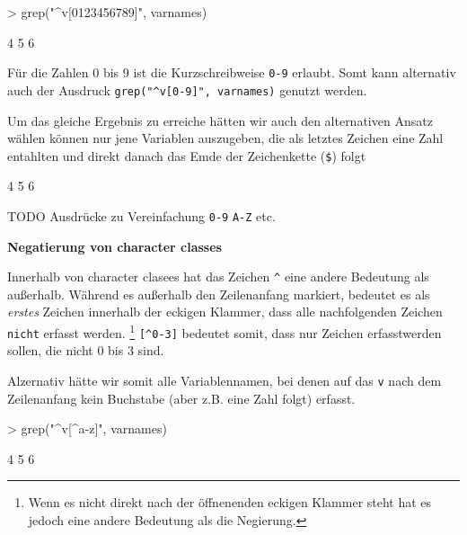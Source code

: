 \documentclass[a4paper]{report}
\begin{document}
\begin{Schunk}
\begin{Sinput}
> grep("^v[0123456789]", varnames)
\end{Sinput}
\begin{Soutput}
[1] 4 5 6
\end{Soutput}
\end{Schunk}

Für die Zahlen 0 bis 9 ist die Kurzschreibweise \verb!0-9! erlaubt. Somt kann alternativ auch der Ausdruck \verb!grep("^v[0-9]", varnames)! genutzt werden.

Um das gleiche Ergebnis zu erreiche  hätten wir auch den alternativen Ansatz wählen können nur jene Variablen auszugeben, die als letztes Zeichen eine Zahl entahlten und direkt danach das Emde der Zeichenkette (\verb!$!) folgt 

\begin{Schunk}
\begin{Soutput}
[1] 4 5 6
\end{Soutput}
\end{Schunk}

TODO Ausdrücke zu Vereinfachung
\verb!0-9!
\verb!A-Z!
etc.

\textbf{Negatierung von character classes}

Innerhalb von character clasees hat das Zeichen \verb!^! eine andere Bedeutung als außerhalb. Während es außerhalb den Zeilenanfang markiert, bedeutet es als \emph{erstes} Zeichen innerhalb der eckigen Klammer, dass alle nachfolgenden Zeichen \texttt{nicht} erfasst werden. \footnote{Wenn es nicht direkt nach der öffnenenden eckigen Klammer steht hat es jedoch eine andere Bedeutung als die Negierung.} \verb![^0-3]! bedeutet somit, dass nur Zeichen erfasstwerden sollen, die nicht 0 bis 3 sind.

Alzernativ hätte wir somit alle Variablennamen, bei denen auf das \texttt{v} nach dem Zeilenanfang kein Buchstabe (aber z.B. eine Zahl folgt) erfasst.

\begin{Schunk}
\begin{Sinput}
> grep("^v[^a-z]", varnames)
\end{Sinput}
\begin{Soutput}
[1] 4 5 6
\end{Soutput}
\end{Schunk}
\end{document}
